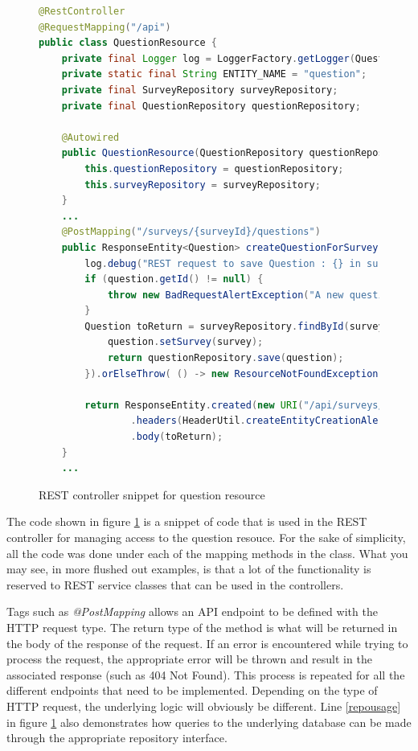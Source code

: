 \begin{figure}[ht]
    \centering
    \begin{lstlisting}[language=Java, escapechar=|]
@RestController
@RequestMapping("/api")
public class QuestionResource {
    private final Logger log = LoggerFactory.getLogger(QuestionResource.class);
    private static final String ENTITY_NAME = "question";
    private final SurveyRepository surveyRepository;
    private final QuestionRepository questionRepository;

    @Autowired
    public QuestionResource(QuestionRepository questionRepository, SurveyRepository surveyRepository) {
        this.questionRepository = questionRepository;
        this.surveyRepository = surveyRepository;
    }
    ...
    @PostMapping("/surveys/{surveyId}/questions")
    public ResponseEntity<Question> createQuestionForSurvey(@PathVariable (value = "surveyId") Long surveyId, @RequestBody Question question) throws URISyntaxException {
        log.debug("REST request to save Question : {} in survey : {}", question, surveyId);
        if (question.getId() != null) {
            throw new BadRequestAlertException("A new question cannot already have an ID", ENTITY_NAME, "idexists");
        }
        Question toReturn = surveyRepository.findById(surveyId).map(survey -> {     |\label{repousage}|
            question.setSurvey(survey);
            return questionRepository.save(question);
        }).orElseThrow( () -> new ResourceNotFoundException("Survey with ID " + surveyId + " not found."));

        return ResponseEntity.created(new URI("/api/surveys/" + surveyId + "/questions/" + toReturn.getId()))
                .headers(HeaderUtil.createEntityCreationAlert(ENTITY_NAME, toReturn.getId().toString()))
                .body(toReturn);
    }
    ...      
    \end{lstlisting}
    \caption{REST controller snippet for question resource}
    \label{restcontrollerexample}
\end{figure}

The code shown in figure \ref{restcontrollerexample} is a snippet of code that is used in the REST controller for managing access to the question resouce.
For the sake of simplicity, all the code was done under each of the mapping methods in the class.
What you may see, in more flushed out examples, is that a lot of the functionality is reserved to REST service classes that can be used in the controllers.

Tags such as \textit{@PostMapping} allows an API endpoint to be defined with the HTTP request type.
The return type of the method is what will be returned in the body of the response of the request.
If an error is encountered while trying to process the request, the appropriate error will be thrown and result in the associated response (such as 404 Not Found).
This process is repeated for all the different endpoints that need to be implemented.
Depending on the type of HTTP request, the underlying logic will obviously be different. 
Line \ref{repousage} in figure \ref{restcontrollerexample} also demonstrates how queries to the underlying database can be made through the appropriate
repository interface.

